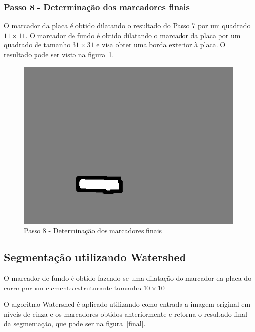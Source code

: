 \documentclass[11pt]{article} %
\begin{document}
\subsubsection{Passo 8 - Determinação dos marcadores finais}
	O marcador da placa é obtido dilatando o resultado do Passo 7 por um quadrado $11\times11$. O marcador de fundo é obtido dilatando o marcador da placa por um quadrado de tamanho $31\times31$ e visa obter uma borda exterior à placa. O resultado pode ser visto na figura~\ref{step7}.
	\begin{figure}[!h]
		\begin{center}
		\includegraphics[scale=0.5]{img_relatorio/step7-markers.png}
		\caption{Passo 8 - Determinação dos marcadores finais}\label{step7}
		\end{center}
	\end{figure}
\newpage


\subsection{Segmentação utilizando Watershed}

O marcador de fundo é obtido fazendo-se uma dilatação do marcador da placa do  carro por um elemento estruturante tamanho $10\times10$. 

O algoritmo Watershed é aplicado utilizando como entrada a imagem original em níveis de cinza e os marcadores obtidos anteriormente e retorna o resultado final da segmentação, que pode ser na figura~\ref{final}.
\end{document}
